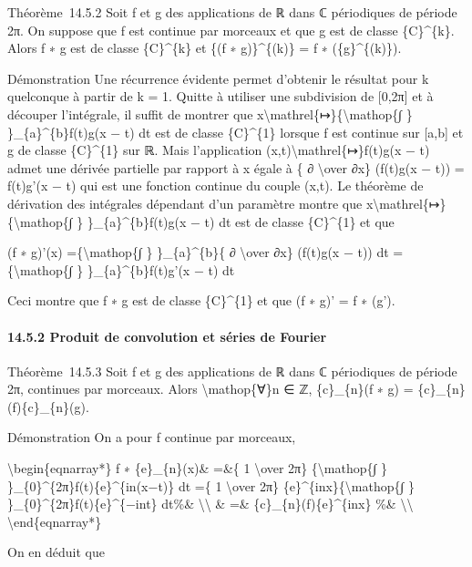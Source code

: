 \documentclass[]{article}
\begin{document}
Théorème~14.5.2 Soit f et g des applications de ℝ dans ℂ périodiques de
période 2π. On suppose que f est continue par morceaux et que g est de
classe \{C\}\^{}\{k\}. Alors f ∗ g est de classe \{C\}\^{}\{k\} et \{(f
∗ g)\}\^{}\{(k)\} = f ∗ (\{g\}\^{}\{(k)\}).

Démonstration Une récurrence évidente permet d'obtenir le résultat pour
k quelconque à partir de k = 1. Quitte à utiliser une subdivision de
{[}0,2π{]} et à découper l'intégrale, il suffit de montrer que
x\textbackslash{}mathrel\{↦\}\{\textbackslash{}mathop\{∫ \}
\}\_\{a\}\^{}\{b\}f(t)g(x − t) dt est de classe \{C\}\^{}\{1\} lorsque f
est continue sur {[}a,b{]} et g de classe \{C\}\^{}\{1\} sur ℝ. Mais
l'application (x,t)\textbackslash{}mathrel\{↦\}f(t)g(x − t) admet une
dérivée partielle par rapport à x égale à \{ ∂ \textbackslash{}over ∂x\}
(f(t)g(x − t)) = f(t)g'(x − t) qui est une fonction continue du couple
(x,t). Le théorème de dérivation des intégrales dépendant d'un paramètre
montre que x\textbackslash{}mathrel\{↦\}\{\textbackslash{}mathop\{∫ \}
\}\_\{a\}\^{}\{b\}f(t)g(x − t) dt est de classe \{C\}\^{}\{1\} et que

(f ∗ g)'(x) =\{\textbackslash{}mathop\{∫ \} \}\_\{a\}\^{}\{b\}\{ ∂
\textbackslash{}over ∂x\} (f(t)g(x − t)) dt =\{\textbackslash{}mathop\{∫
\} \}\_\{a\}\^{}\{b\}f(t)g'(x − t) dt

Ceci montre que f ∗ g est de classe \{C\}\^{}\{1\} et que (f ∗ g)' = f ∗
(g').

\paragraph{14.5.2 Produit de convolution et séries de Fourier}

Théorème~14.5.3 Soit f et g des applications de ℝ dans ℂ périodiques de
période 2π, continues par morceaux. Alors \textbackslash{}mathop\{∀\}n ∈
ℤ, \{c\}\_\{n\}(f ∗ g) = \{c\}\_\{n\}(f)\{c\}\_\{n\}(g).

Démonstration On a pour f continue par morceaux,

\textbackslash{}begin\{eqnarray*\} f ∗ \{e\}\_\{n\}(x)\& =\&\{ 1
\textbackslash{}over 2π\} \{\textbackslash{}mathop\{∫ \}
\}\_\{0\}\^{}\{2π\}f(t)\{e\}\^{}\{in(x−t)\} dt =\{ 1
\textbackslash{}over 2π\} \{e\}\^{}\{inx\}\{\textbackslash{}mathop\{∫ \}
\}\_\{0\}\^{}\{2π\}f(t)\{e\}\^{}\{−int\} dt\%\&
\textbackslash{}\textbackslash{} \& =\& \{c\}\_\{n\}(f)\{e\}\^{}\{inx\}
\%\& \textbackslash{}\textbackslash{} \textbackslash{}end\{eqnarray*\}

On en déduit que
\end{document}
